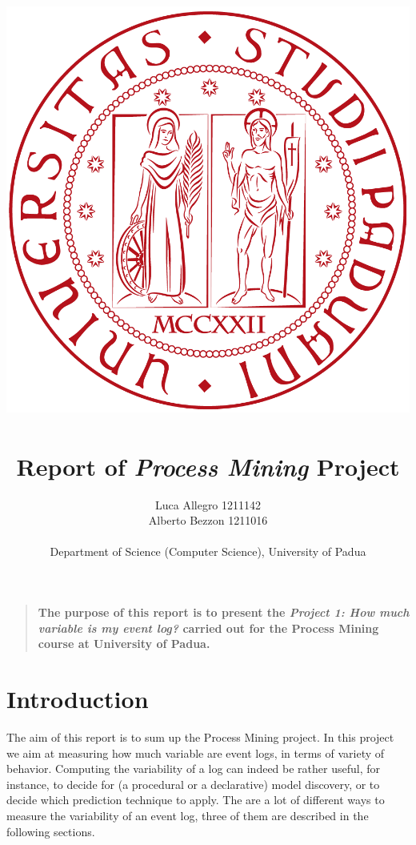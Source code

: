 \documentclass[12pt]{article}
\title{
		\includegraphics[scale=0.20]{logo-unipd}~ 
		\\[2cm]
		Report of {\it Process Mining\/} Project
	}
\author
{Luca Allegro 1211142 \\ Alberto Bezzon 1211016\\
\\
Department of Science (Computer Science), University of Padua
}
\date{}
\newenvironment{sciabstract}{%
\begin{quote} \bf}
{\end{quote}}
\begin{document}
 


\baselineskip18pt


\maketitle 




\begin{sciabstract}
	The purpose of this report is to present the \textit{Project 1: How much variable is my event log?} carried out for the Process Mining course at University of Padua.
\end{sciabstract}




\newpage
\section*{Introduction}

The aim of this report is to sum up the Process Mining project. In this project we aim at measuring how much variable are event logs, in terms of variety of behavior. Computing the variability of a log can indeed be rather useful, for instance, to decide for (a procedural or a declarative) model discovery, or to decide which prediction technique to apply. The are a lot of different ways to measure the variability of an event log, three of them are described in the following sections.
\end{document}
